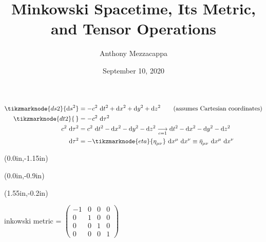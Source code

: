\documentclass{article}
\title{Minkowski Spacetime, Its Metric, and Tensor Operations}
\author{Anthony Mezzacappa}
\date{September 10, 2020}
\begin{document}
\setlength{\parskip}{1em}
\maketitle

\begin{align*}
    \tikzmarknode{ds2}{\mathrm{d} s^2} &= -c^2 ~ \mathrm{d}t^2 + \mathrm{d}x^2 + \mathrm{d}y^2 + \mathrm{d}z^2 \qquad \text{(assumes Cartesian coordinates)} \\
    \tikzmarknode{dt2}{\,} &= -c^2 ~ \mathrm{d}\tau^2 \\
    c^2 ~ \mathrm{d}\tau^2 &= c^2 ~ \mathrm{d}t^2 - \mathrm{d}x^2 - \mathrm{d}y^2 - \mathrm{d}z^2 \underset{c=1}{\longrightarrow} \mathrm{d}t^2 - \mathrm{d}x^2 - \mathrm{d}y^2 - \mathrm{d}z^2 \\
    \mathrm{d}\tau^2 &= - \tikzmarknode{eta}{\tensor{\eta}{_\mu_\nu}} ~ \mathrm{d} \tensor{x}{^\mu} ~ \mathrm{d} \tensor{x}{^\nu} \equiv \tensor{\bar{\eta}}{_\mu_\nu} ~ \mathrm{d} \tensor{x}{^\mu} ~ \mathrm{d} \tensor{x}{^\nu}
\end{align*}
{%
\begin{textblock*}{1in}(0.0in,-1.15in)%
\begin{minipage}[h!]{1in}
\end{minipage}%
\end{textblock*}%
}%
{%
\begin{textblock*}{1in}(0.0in,-0.9in)%
\begin{minipage}[h!]{1in}
\end{minipage}%
\end{textblock*}%
}
{%
\begin{textblock*}{3in}(1.55in,-0.2in)%
\begin{minipage}[h!]{3in}
    inkowski metric = %
    $\begin{pmatrix}
    -1 & 0 & 0 & 0 \\
    0  & 1 & 0 & 0 \\
    0  & 0 & 1 & 0 \\
    0  & 0 & 0 & 1
    \end{pmatrix}$
\end{minipage}%
\end{textblock*}%
}
\end{document}
